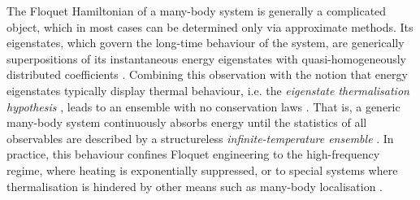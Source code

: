 \documentclass[prl,aps,twocolumn,notitlepage,10pt]{revtex4-1}
\begin{document}
The Floquet Hamiltonian of a many-body system is generally a complicated
object, which in most cases can be determined only via approximate methods.
Its eigenstates, which govern the long-time behaviour of the system, are
generically superpositions of its instantaneous energy eigenstates with
quasi-homogeneously distributed coefficients 
\cite{Moessner-Sondhi,Zhang-Khemani-Huse}.
Combining this observation with the notion that energy eigenstates typically
display thermal behaviour, i.e. the \emph{eigenstate thermalisation hypothesis}
\cite{Deutsch,Srednicki,Rigol-Dunjko-Olshanii,DAlessio-Kafri-Polkovnikov-Rigol},
leads to an ensemble with no conservation laws
\cite{DAlessio-Rigol,Kim-Ikeda-Huse}.
That is, a generic many-body system continuously absorbs energy until the
statistics of all observables are described by a structureless
\emph{infinite-temperature ensemble}
\cite{Ponte-Chandran-Papic-Abanin,Russomanno-Silva-Santoro,Kuwahara-Mori-Saito,Abanin-DeRoeck-Huveneers}.
In practice, this behaviour confines Floquet engineering to the high-frequency
regime, where heating is exponentially suppressed, or to special systems where
thermalisation is hindered by other means such as many-body localisation
\cite{Fleckenstein-Bukov,Ishii-Kuwahara-Mori-Hatano,BAA,Nandkishore-Huse,vonKeyserlingk-Sondhi}.
\end{document}
